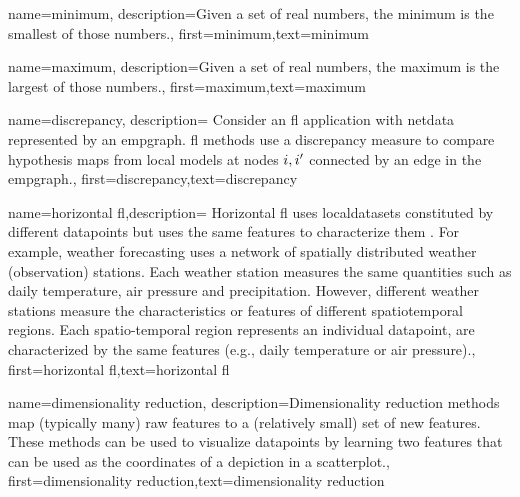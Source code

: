 
{
	name=minimum,
	description={Given a set of real numbers, the minimum is the smallest of those numbers.},
	first={minimum},text={minimum}
}


{name=maximum,
 description={Given a set of real numbers, the maximum is the largest of those numbers.},
 first={maximum},text={maximum}
}

{name=discrepancy,
	description={
		Consider an \gls{fl} application with \gls{netdata} 
		represented by an \gls{empgraph}. \gls{fl} methods use a discrepancy measure 
		to compare \gls{hypothesis} maps from local models at nodes $i,i'$ 
		connected by an edge in the \gls{empgraph}.},
	first={discrepancy},text={discrepancy}
}



{name={horizontal \gls{fl}},description=
	{Horizontal \gls{fl} uses \gls{localdataset}s constituted by different
	   \gls{datapoint}s but uses the same \gls{feature}s to characterize them \cite{HFLChapter2020}.
		For example, weather forecasting uses a network of spatially distributed
		weather (observation) stations. Each weather station measures the
		same quantities such as daily temperature, air pressure and precipitation.
		However, different weather stations measure the characteristics or
		\gls{feature}s of different spatiotemporal regions. Each spatio-temporal region 
		represents an individual \gls{datapoint}, are characterized by the same \gls{feature}s 
		(e.g., daily temperature or air pressure).},
	first={horizontal \gls{fl}},text={horizontal \gls{fl}}
} 

{name={dimensionality reduction},
	description={Dimensionality reduction methods 
		map (typically many) raw \gls{feature}s to a (relatively small) set of 
		new \gls{feature}s. These methods can be used to visualize \gls{datapoint}s 
		by learning two \gls{feature}s that can be used as the coordinates of a 
		depiction in a \gls{scatterplot}.}, first={dimensionality reduction},text={dimensionality reduction}
} 

